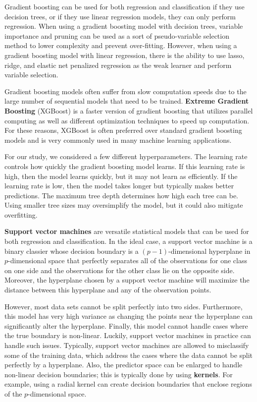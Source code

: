 \documentclass{article}
\begin{document}
Gradient boosting can be used for both regression and classification if they use decision trees, or if they use linear regression models, they can only perform regression. When using a gradient boosting model with decision trees, variable importance and pruning can be used as a sort of pseudo-variable selection method to lower complexity and prevent over-fitting. However, when using a gradient boosting model with linear regression, there is the ability to use lasso, ridge, and elastic net penalized regression as the weak learner and perform variable selection.

Gradient boosting models often suffer from slow computation speeds due to the large number of sequential models that need to be trained. \textbf{Extreme Gradient Boosting} (XGBoost) is a faster version of gradient boosting that utilizes parallel computing as well as different optimization techniques to speed up computation. For these reasons, XGBoost is often preferred over standard gradient boosting models and is very commonly used in many machine learning applications.

For our study, we considered a few different hyperparameters. The learning rate controls how quickly the gradient boosting model learns. If this learning rate is high, then the model learns quickly, but it may not learn as efficiently. If the learning rate is low, then the model takes longer but typically makes better predictions. The maximum tree depth determines how high each tree can be. Using smaller tree sizes may oversimplify the model, but it could also mitigate overfitting.

\textbf{Support vector machines} are versatile statistical models that can be used for both regression and classification. In the ideal case, a support vector machine is a binary classier whose decision boundary is a $(p-1)$-dimensional hyperplane in $p$-dimensional space that perfectly separates all of the observations for one class on one side and the observations for the other class lie on the opposite side. Moreover, the hyperplane chosen by a support vector machine will maximize the distance between this hyperplane and any of the observation points.

However, most data sets cannot be split perfectly into two sides. Furthermore, this model has very high variance as changing the points near the hyperplane can significantly alter the hyperplane. Finally, this model cannot handle cases where the true boundary is non-linear. Luckily, support vector machines in practice can handle such issues. Typically, support vector machines are allowed to misclassify some of the training data, which address the cases where the data cannot be split perfectly by a hyperplane. Also, the predictor space can be enlarged to handle non-linear decision boundaries; this is typically done by using \textbf{kernels}. For example, using a radial kernel can create decision boundaries that enclose regions of the $p$-dimensional space.
\end{document}
